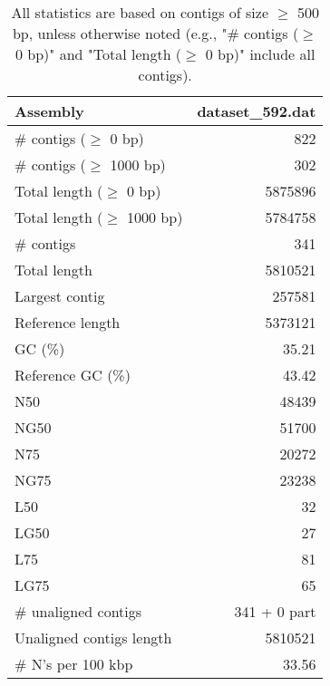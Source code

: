 \documentclass[12pt,a4paper]{article}
\begin{document}
\begin{table}[ht]
\begin{center}
\caption{All statistics are based on contigs of size $\geq$ 500 bp, unless otherwise noted (e.g., "\# contigs ($\geq$ 0 bp)" and "Total length ($\geq$ 0 bp)" include all contigs).}
\begin{tabular}{|l*{1}{|r}|}
\hline
Assembly & dataset\_592.dat \\ \hline
\# contigs ($\geq$ 0 bp) & 822 \\ \hline
\# contigs ($\geq$ 1000 bp) & 302 \\ \hline
Total length ($\geq$ 0 bp) & 5875896 \\ \hline
Total length ($\geq$ 1000 bp) & 5784758 \\ \hline
\# contigs & 341 \\ \hline
Total length & 5810521 \\ \hline
Largest contig & 257581 \\ \hline
Reference length & 5373121 \\ \hline
GC (\%) & 35.21 \\ \hline
Reference GC (\%) & 43.42 \\ \hline
N50 & 48439 \\ \hline
NG50 & 51700 \\ \hline
N75 & 20272 \\ \hline
NG75 & 23238 \\ \hline
L50 & 32 \\ \hline
LG50 & 27 \\ \hline
L75 & 81 \\ \hline
LG75 & 65 \\ \hline
\# unaligned contigs & 341 + 0 part \\ \hline
Unaligned contigs length & 5810521 \\ \hline
\# N's per 100 kbp & 33.56 \\ \hline
\end{tabular}
\end{center}
\end{table}
\end{document}
